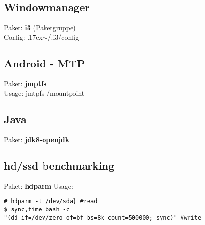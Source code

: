 \subsection{Windowmanager}
Paket: \textbf{i3} (Paketgruppe) \\ 
Config: {{\raise.17ex\hbox{$\scriptstyle\mathtt{\sim}$}}/.i3/config} \\

\subsection{Android - MTP}
Paket: \textbf{jmptfs} \\ 
Usage: jmtpfs /mountpoint  

\subsection{Java}
Paket: \textbf{jdk8-openjdk}

\subsection{hd/ssd benchmarking}
Paket: \textbf{hdparm}
Usage:
\begin{lstlisting}[style=Bash]
# hdparm -t /dev/sda} #read
$ sync;time bash -c 
"(dd if=/dev/zero of=bf bs=8k count=500000; sync)" #write
\end{lstlisting}



